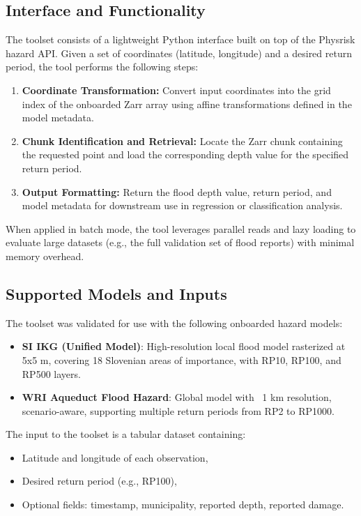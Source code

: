 \subsection{Interface and Functionality}

The toolset consists of a lightweight Python interface built on top of the Physrisk hazard API. Given a set of coordinates (latitude, longitude) and a desired return period, the tool performs the following steps:

\begin{enumerate}
    \item \textbf{Coordinate Transformation:} Convert input coordinates into the grid index of the onboarded Zarr array using affine transformations defined in the model metadata.
    
    \item \textbf{Chunk Identification and Retrieval:} Locate the Zarr chunk containing the requested point and load the corresponding depth value for the specified return period.
    
    \item \textbf{Output Formatting:} Return the flood depth value, return period, and model metadata for downstream use in regression or classification analysis.
\end{enumerate}

When applied in batch mode, the tool leverages parallel reads and lazy loading to evaluate large datasets (e.g., the full validation set of flood reports) with minimal memory overhead.

\subsection{Supported Models and Inputs}

The toolset was validated for use with the following onboarded hazard models:

\begin{itemize}
    \item \textbf{SI IKG (Unified Model)}: High-resolution local flood model rasterized at 5x5 m, covering 18 Slovenian areas of importance, with RP10, RP100, and RP500 layers.
    \item \textbf{WRI Aqueduct Flood Hazard}: Global model with ~1 km resolution, scenario-aware, supporting multiple return periods from RP2 to RP1000.
\end{itemize}

The input to the toolset is a tabular dataset containing:
\begin{itemize}
    \item Latitude and longitude of each observation,
    \item Desired return period (e.g., RP100),
    \item Optional fields: timestamp, municipality, reported depth, reported damage.
\end{itemize}

